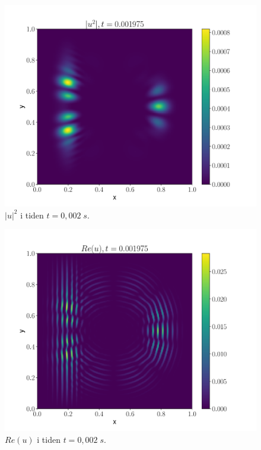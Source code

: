 \documentclass[reprint,english,notitlepage]{revtex4-2}  %
\begin{document}
\begin{figure}[H]
\centering
\includegraphics[scale=0.45, trim={3cm 0 0 0}]{../Images/ImshowUt0001975sl2.pdf}
\caption{$|u|^2 $ i tiden $t = 0,002 \; s$.}
\label{Fig:s2u2t02}
\end{figure}

\begin{figure}[H]
\centering
\includegraphics[scale=0.45, trim={3cm 0 0 0}]{../Images/ImshowRe0001975sl2.pdf}
\caption{$Re(u) $ i tiden $t = 0,002 \; s$.}
\label{Fig:s2Ret02}
\end{figure}
\end{document}
